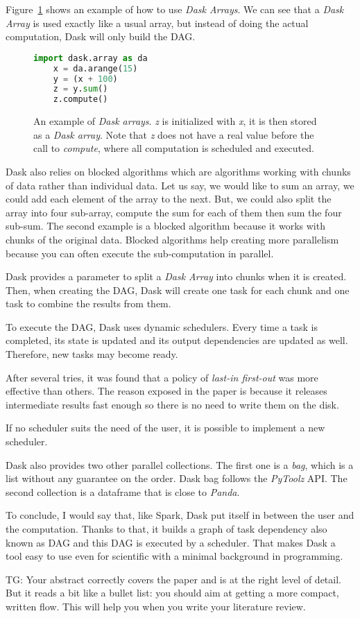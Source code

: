 \documentclass{article}
\newcommand{\tristan}[1]{\color{red}TG: #1}
\begin{document}
Figure~\ref{fig:example-dask} shows an example of how to use \textit{Dask Arrays}.
We can see that a \textit{Dask Array} is used exactly like a usual array, but instead
of doing the actual computation, Dask will only build the DAG.
\begin{figure}[h] 
	\center
	\begin{lstlisting}[language=python]
	import dask.array as da
	x = da.arange(15)
	y = (x + 100)
	z = y.sum()
	z.compute()
	\end{lstlisting}
	\caption{An example of \textit{Dask arrays}. \textit{z} is initialized with \textit{x}, it is then stored as a
	\textit{Dask array}. Note that \textit{z} does not have a real value before the call to \textit{compute}, where all computation is scheduled and executed.}
	\label{fig:example-dask}
\end{figure} 

Dask also relies on blocked algorithms which are algorithms working with chunks of data rather than individual data.
Let us say, we would like to sum an array, we could add each element of the array to the next.
But, we could also split the array into four sub-array, compute the sum for each of them then sum the four sub-sum.
The second example is a blocked algorithm because it works with chunks of the original data.
Blocked algorithms help creating more parallelism because you can often execute the sub-computation in parallel.

Dask provides a parameter to split a \textit{Dask Array} into chunks when it is created.
Then, when creating the DAG, Dask will create one task for each chunk and one task to combine the results from them.

To execute the DAG, Dask uses dynamic schedulers.
Every time a task is completed, its state is updated and its output dependencies are updated as well.
Therefore, new tasks may become ready.

After several tries, it was found that a policy of \textit{last-in first-out} was more effective than others.
The reason exposed in the paper is because it releases intermediate results fast enough so there is no need to write them on the disk.

If no scheduler suits the need of the user, it is possible to implement a new scheduler.

Dask also provides two other parallel collections.
The first one is a \textit{bag}, which is a list without any guarantee on the order.
Dask bag follows the \textit{PyToolz} API.
The second collection is a dataframe that is close to \textit{Panda}.

To conclude, I would say that, like Spark, Dask put itself in between the user and the computation.
Thanks to that, it builds a graph of task dependency also known as DAG and this DAG is executed by a scheduler.
That makes Dask a tool easy to use even for scientific with a minimal background in programming.

\tristan{Your abstract correctly covers the paper and is at the right level of detail.
But it reads a bit like a bullet list: you should aim at getting a more compact, written flow.
This will help you when you write your literature review.}
\end{document}
